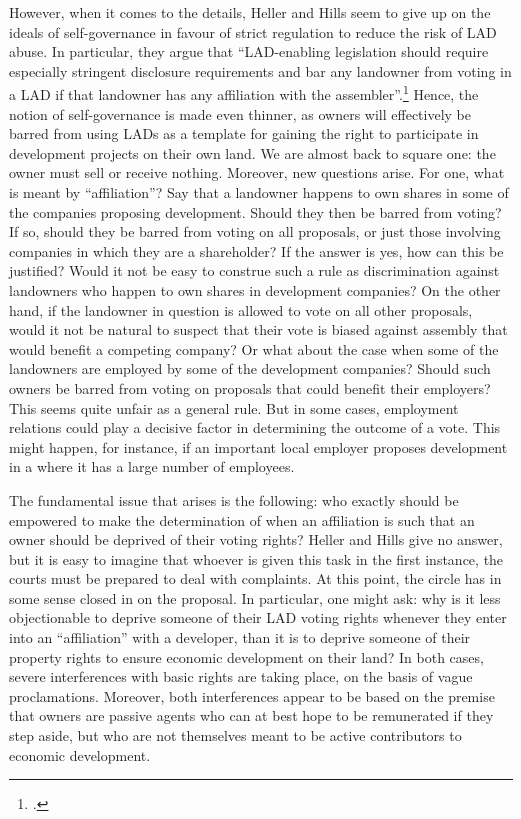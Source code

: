 However, when it comes to the details, Heller and Hills seem to give up on the ideals of self-governance in favour of strict regulation to reduce the risk of LAD abuse. In particular, they argue that ``LAD-enabling legislation should require especially stringent disclosure requirements and bar any landowner from voting in a LAD if that landowner has any affiliation with the assembler''.\footcite{heller08} Hence, the notion of self-governance is made even thinner, as owners will effectively be barred from using LADs as a template for gaining the right to participate in development projects on their own land. We are almost back to square one: the owner must sell or receive nothing.  Moreover, new questions arise. For one, what is meant by ``affiliation''? Say that a landowner happens to own shares in some of the companies proposing development. Should they then be barred from voting? If so, should they be barred from voting on all proposals, or just those involving companies in which they are a shareholder? If the answer is yes, how can this be justified? Would it not be easy to construe such a rule as discrimination against landowners who happen to own shares in development companies? On the other hand, if the landowner in question is allowed to vote on all other proposals, would it not be natural to suspect that their vote is biased against assembly that would benefit a competing company? Or what about the case when some of the landowners are employed by some of the development companies? Should such owners be barred from voting on proposals that could benefit their employers? This seems quite unfair as a general rule. But in some cases, employment relations could play a decisive factor in determining the outcome of a vote. This might happen, for instance, if an important local employer proposes development in a  where it has a large number of employees.

The fundamental issue that arises is the following: who exactly should be empowered to make the determination of when an affiliation is such that an owner should be deprived of their voting rights? Heller and Hills give no answer, but it is easy to imagine that whoever is given this task in the first instance, the courts must be prepared to deal with complaints. At this point, the circle has in some sense closed in on the proposal. In particular, one might ask: why is it less objectionable to deprive someone of their LAD voting rights whenever they enter into an ``affiliation'' with a developer, than it is to deprive someone of their property rights to ensure economic development on their land? In both cases, severe interferences with basic rights are taking place, on the basis of vague proclamations. Moreover, both interferences appear to be based on the premise that owners are passive agents who can at best hope to be remunerated if they step aside, but who are not themselves meant to be active contributors to economic development.

